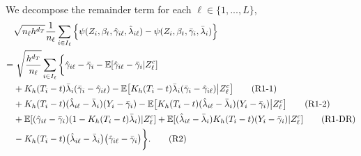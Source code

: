 \documentclass[lettersize, 12pt]{article}
\begin{document}
We decompose the remainder term for each $\ell\in\{1,..., L\}$,
\begin{align}
&\sqrt{n_\ell h^{d_T}}\frac{1}{n_\ell}\sum_{i\in I_\ell}\left\{  \psi(Z_i, \beta_t, \hat \gamma_{i\ell}, \hat \lambda_{i\ell}) - \psi(Z_i, \beta_t, \bar \gamma_i, \bar \lambda_i) \right\} \notag \\
=&\ \sqrt{\frac{h^{d_T}}{n_\ell}} \sum_{i\in I_\ell}\bigg\{ 
\hat \gamma_{i\ell} - \bar \gamma_i - \mathbb{E}[\hat \gamma_{i\ell} - \bar \gamma_i|Z_\ell^c]   
\notag \\
& + K_h(T_i - t)\bar \lambda_i (\bar \gamma_i - \hat \gamma_{i\ell}) - \mathbb{E}\big[K_h(T_i - t)\bar \lambda_i (\bar \gamma_i -\hat \gamma_{i\ell})\big|Z_\ell^c\big] 
\tag{R1-1} \label{ER11} \\
& + 
K_h(T_i - t)(\hat \lambda_{i\ell} - \bar \lambda_i)(Y_i - \bar \gamma_i) - \mathbb{E}\big[K_h(T_i - t)(\hat \lambda_{i\ell} - \bar \lambda_i)(Y_i - \bar \gamma_i) \big|Z_\ell^c\big]
 \tag{R1-2} \label{ER12} \\
& + 
\mathbb{E}[ (\hat \gamma_{i\ell} - \bar \gamma_i)(1-K_h(T_i - t) \bar \lambda_i)|Z_\ell^c] 
+ \mathbb{E}[ (\hat \lambda_{i\ell} - \bar \lambda_i) K_h(T_i - t) (Y_i - \bar \gamma_i)|Z_\ell^c] 
\tag{R1-DR} \label{ER1DR} \\
& - 
K_h(T_i - t)\big(\hat \lambda_{i\ell} - \bar \lambda_i\big)\big(\hat \gamma_{i\ell} - \bar \gamma_i\big)\bigg\}. 
\tag{R2} \label{ER2}
\end{align}
\end{document}
